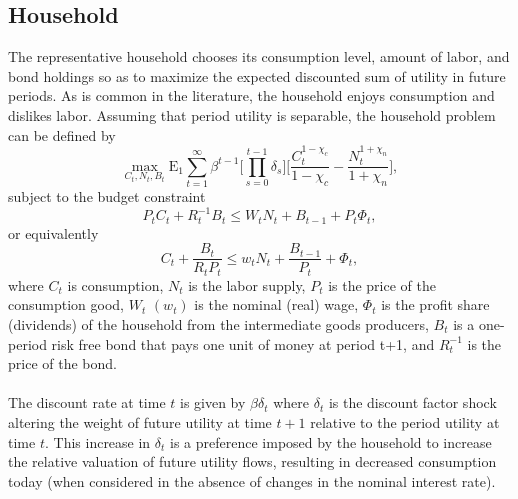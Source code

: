 \documentclass[11pt]{article}
\begin{document}
\begin{singlespace}
		\subsection{Household}

		\normalsize{The representative household chooses its consumption level, amount of labor, and bond holdings so as to maximize the expected discounted sum of utility in future periods. As is common in the literature, the household enjoys consumption and dislikes labor. Assuming that period utility is separable, the household problem can be defined by}
		\begin{equation}
			\max\limits_{C_{t},N_{t},B_{t}}\mathrm{E_{1}}\sum\limits_{t=1}^{\infty}\beta^{t-1}\Bigg[\prod\limits_{s=0}^{t-1}\delta_{s}\Bigg]\Bigg[\frac{C_{t}^{1-\chi_{c}}}{1-\chi_{c}}-\frac{N_{t}^{1+\chi_{n}}}{1+\chi_{n}}\Bigg],
		\end{equation}
		\normalsize{subject to the budget constraint}
		\begin{equation}
			P_{t}C_{t} + R_{t}^{-1}B_{t} \leq W_{t}N_{t}+B_{t-1}+P_{t}\Phi_{t}, %
		\end{equation}
		\normalsize{or equivalently}
		\begin{equation}
			C_{t} + \frac{B_{t}}{R_{t}P_{t}} \leq w_{t}N_{t} + \frac{B_{t-1}}{P_{t}}+\Phi_{t}, %
		\end{equation}
		\normalsize{where \(C_{t}\) is consumption, \(N_{t}\) is the labor supply, \(P_{t}\) is the price of the consumption good, \(W_{t}\) \((w_{t})\) is the nominal (real) wage, \(\Phi_{t}\) is the profit share (dividends) of the household from the intermediate goods producers, \(B_{t}\) is a one-period risk free bond that pays one unit of money at period t+1, and \(R_{t}^{-1}\) is the price of the bond.}\\\\

		\normalsize{The discount rate at time $t$ is given by \(\beta\delta_{t}\) where \(\delta_{t}\) is the discount factor shock altering the weight of future utility at time $t+1$ relative to the period utility at time $t$.} %
		\normalsize{This increase in \(\delta_{t}\) is a preference imposed by the household to increase the relative valuation of future utility flows, resulting in decreased consumption today (when considered in the absence of changes in the nominal interest rate).}


\end{singlespace}
\end{document}

